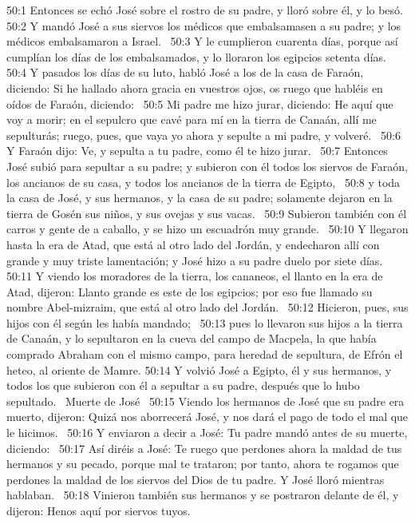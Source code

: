 50:1 Entonces se echó José sobre el rostro de su padre, y lloró sobre él, y lo besó.  
50:2 Y mandó José a sus siervos los médicos que embalsamasen a su padre; y los médicos embalsamaron a Israel.  
50:3 Y le cumplieron cuarenta días, porque así cumplían los días de los embalsamados, y lo lloraron los egipcios setenta días.  
50:4 Y pasados los días de su luto, habló José a los de la casa de Faraón, diciendo: Si he hallado ahora gracia en vuestros ojos, os ruego que habléis en oídos de Faraón, diciendo:  
50:5 Mi padre me hizo jurar, diciendo: He aquí que voy a morir; en el sepulcro que cavé para mí en la tierra de Canaán, allí me sepulturás; ruego, pues, que vaya yo ahora y sepulte a mi padre, y volveré.  
50:6 Y Faraón dijo: Ve, y sepulta a tu padre, como él te hizo jurar.  
50:7 Entonces José subió para sepultar a su padre; y subieron con él todos los siervos de Faraón, los ancianos de su casa, y todos los ancianos de la tierra de Egipto,  
50:8 y toda la casa de José, y sus hermanos, y la casa de su padre; solamente dejaron en la tierra de Gosén sus niños, y sus ovejas y sus vacas.  
50:9 Subieron también con él carros y gente de a caballo, y se hizo un escuadrón muy grande.  
50:10 Y llegaron hasta la era de Atad, que está al otro lado del Jordán, y endecharon allí con grande y muy triste lamentación; y José hizo a su padre duelo por siete días.  
50:11 Y viendo los moradores de la tierra, los cananeos, el llanto en la era de Atad, dijeron: Llanto grande es este de los egipcios; por eso fue llamado su nombre Abel-mizraim, que está al otro lado del Jordán.  
50:12 Hicieron, pues, sus hijos con él según les había mandado;  
50:13 pues lo llevaron sus hijos a la tierra de Canaán, y lo sepultaron en la cueva del campo de Macpela, la que había comprado Abraham con el mismo campo, para heredad de sepultura, de Efrón el heteo, al oriente de Mamre. 
50:14 Y volvió José a Egipto, él y sus hermanos, y todos los que subieron con él a sepultar a su padre, después que lo hubo sepultado.  
Muerte de José  
50:15 Viendo los hermanos de José que su padre era muerto, dijeron: Quizá nos aborrecerá José, y nos dará el pago de todo el mal que le hicimos.  
50:16 Y enviaron a decir a José: Tu padre mandó antes de su muerte, diciendo:  
50:17 Así diréis a José: Te ruego que perdones ahora la maldad de tus hermanos y su pecado, porque mal te trataron; por tanto, ahora te rogamos que perdones la maldad de los siervos del Dios de tu padre. Y José lloró mientras hablaban.  
50:18 Vinieron también sus hermanos y se postraron delante de él, y dijeron: Henos aquí por siervos tuyos.  
